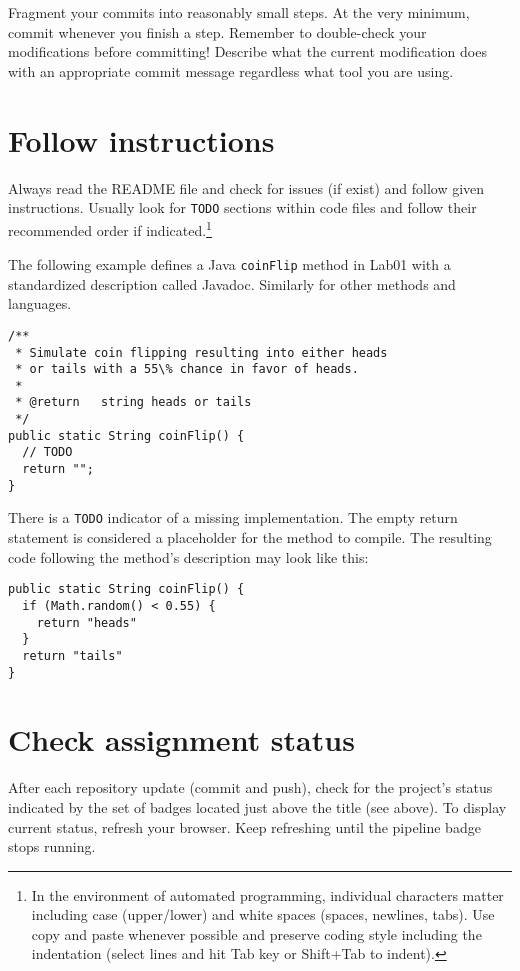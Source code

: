 {Fragment your commits into reasonably small steps. At the very minimum, commit whenever you finish a step. Remember to double-check your modifications before committing! Describe what the current modification does with an appropriate commit message regardless what tool you are using.}

\section{Follow instructions}\label{sec:followins}

{Always read the README file and check for issues (if exist) and follow given instructions. Usually look for \texttt{TODO} sections within code files and follow their recommended order if indicated.\footnote{In the environment of automated programming, individual characters matter including case (upper/lower) and white spaces (spaces, newlines, tabs). Use copy and paste whenever possible and preserve coding style including the indentation (select lines and hit Tab key or Shift+Tab to indent).}}

{The following example defines a Java \texttt{coinFlip} method in Lab01 with a standardized description called Javadoc. Similarly for other methods and languages.}

\begin{verbatim}
/**
 * Simulate coin flipping resulting into either heads
 * or tails with a 55\% chance in favor of heads.
 *
 * @return   string heads or tails
 */
public static String coinFlip() {
  // TODO
  return "";
}
\end{verbatim}

{There is a \texttt{TODO} indicator of a missing implementation. The empty return statement is considered a placeholder for the method to compile. The resulting code following the method's description may look like this:}

\begin{verbatim}
public static String coinFlip() {
  if (Math.random() < 0.55) {
    return "heads"
  }
  return "tails"
}
\end{verbatim}

\section{Check assignment status}\label{sec:checkassnstat}

{After each repository update (commit and push), check for the project's status indicated by the set of badges located just above the title (see above). To display current status, refresh your browser. Keep refreshing until the pipeline badge stops running.}

